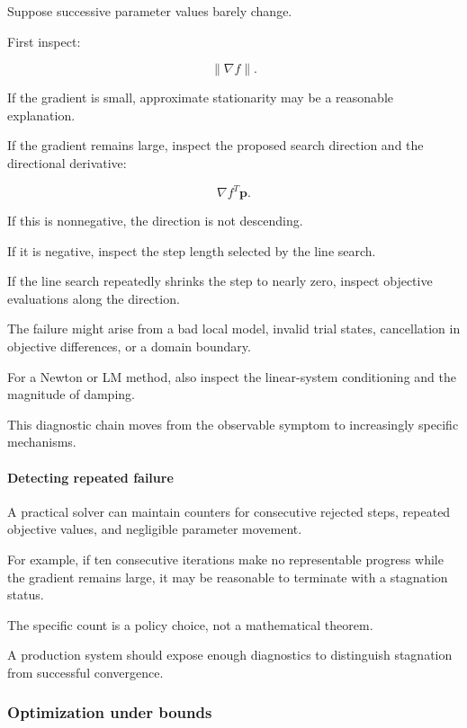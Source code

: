 \hypertarget{02-foundations-ii-ch027-a-useful-diagnostic-procedure}{}

Suppose successive parameter values barely change.

First inspect:

\[
\|\nabla f\|.
\]

If the gradient is small, approximate stationarity may be a reasonable explanation.

If the gradient remains large, inspect the proposed search direction and the directional derivative:

\[
\nabla f^T\mathbf p.
\]

If this is nonnegative, the direction is not descending.

If it is negative, inspect the step length selected by the line search.

If the line search repeatedly shrinks the step to nearly zero, inspect objective evaluations along the direction.

The failure might arise from a bad local model, invalid trial states, cancellation in objective differences, or a domain boundary.

For a Newton or LM method, also inspect the linear-system conditioning and the magnitude of damping.

This diagnostic chain moves from the observable symptom to increasingly specific mechanisms.

\paragraph{Detecting repeated failure}\label{02-foundations-ii-ch027-detecting-repeated-failure}

\hypertarget{02-foundations-ii-ch027-detecting-repeated-failure}{}

A practical solver can maintain counters for consecutive rejected steps, repeated objective values, and negligible parameter movement.

For example, if ten consecutive iterations make no representable progress while the gradient remains large, it may be reasonable to terminate with a stagnation status.

The specific count is a policy choice, not a mathematical theorem.

A production system should expose enough diagnostics to distinguish stagnation from successful convergence.

\subsubsection{Optimization under bounds}\label{02-foundations-ii-ch027-optimization-under-bounds}

